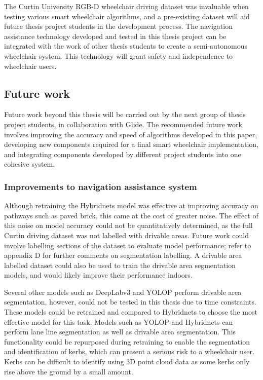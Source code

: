 The Curtin University RGB-D wheelchair driving dataset was invaluable
when testing various smart wheelchair algorithms, and a pre-existing dataset will
aid future thesis project students in the development process.
The navigation assistance technology developed and tested in this thesis project
can be integrated with the work of other thesis students to create a semi-autonomous
wheelchair system. This technology will grant safety and independence
to wheelchair users.

\pagebreak
\subsection{Future work}
\label{sec:future_work}
Future work beyond this thesis will be carried out by the next
group of thesis project students, in collaboration with Glide.
The recommended future work involves improving the accuracy
and speed of algorithms developed in this paper, developing
new components required for a final smart wheelchair implementation,
and integrating components developed by different project students into 
one cohesive system.

\subsubsection{Improvements to navigation assistance system}

Although retraining the Hybridnets model was effective at improving
accuracy on pathways such as paved brick, this came at the cost
of greater noise. The effect of this noise on model accuracy
could not be quantitatively determined, as the full Curtin driving dataset
was not labelled with drivable areas. Future work could involve labelling sections of the
dataset to evaluate model performance; refer to appendix D for further comments on segmentation labelling.
A drivable area labelled dataset could
also be used to train the drivable area segmentation models,
and would likely improve their performance indoors.

Several other models such as DeepLabv3 and YOLOP perform drivable area
segmentation, however, could not be tested in this thesis due to time constraints.
These models could be retrained and compared to Hybridnets
to choose the most effective model for this task.
Models such as YOLOP and Hybridnets can perform
lane line segmentation as well as drivable area segmentation. This functionality could be repurposed
during retraining to enable the segmentation and identification of kerbs,
which can present a serious risk to a wheelchair user. Kerbs can be difficult
to identify using 3D point cloud data as some kerbs only rise above
the ground by a small amount.

